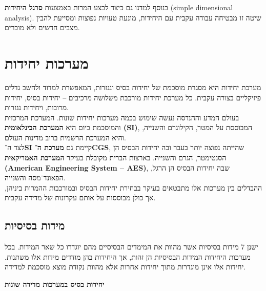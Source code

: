 \documentclass[
  hebrew,
  letterpaper,
  DIV=11,
  numbers=noendperiod]{scrreprt}
\begin{document}
{בנוסף למדנו גם כיצד לבצע המרות באמצעות \textbf{סרגל היחידות} (}simple
dimensional analysis{). שיטה זו מבטיחה עבודה עקבית עם היחידות, מונעת
טעויות נפוצות ומסייעת להבין מצבים חדשים ולא מוכרים.}

\section{\texorpdfstring{{מערכות
יחידות}}{מערכות יחידות}}\label{ux5deux5e2ux5e8ux5dbux5d5ux5ea-ux5d9ux5d7ux5d9ux5d3ux5d5ux5ea}

מערכת יחידות היא מסגרת מוסכמת של יחידות בסיס ונגזרות, המאפשרת למדוד
ולחשב גדלים פיזיקליים בצורה עקבית. כל מערכת יחידות מורכבת משלושה מרכיבים
-- יחידות בסיס, יחידות מרובות, ויחידות נגזרות.\\
בעולם המדע וההנדסה נעשה שימוש בכמה מערכות יחידות שונות. המערכת המרכזית
והמוסכמת כיום היא \textbf{המערכת הבינלאומית (SI)}, המבוססת על המטר,
הקילוגרם והשנייה, והיא המערכת הרשמית ברוב מדינות העולם.\\
לצד ה־\textbf{SI} קיימת גם \textbf{מערכת ה־CGS}, שהייתה נפוצה יותר בעבר
ובה יחידות הבסיס הן הסנטימטר, הגרם והשנייה. בארצות הברית מקובלת בעיקר
\textbf{המערכת האמריקאית (American Engineering System -- AES)}, שבה
יחידות הבסיס הן הרגל, הפאונד־מסה והשנייה.\\
ההבדלים בין מערכות אלו מתבטאים בעיקר בבחירת יחידות הבסיס ובמורכבות
ההמרות ביניהן, אך כולן מבוססות על אותם עקרונות של מדידה עקבית.

\subsection{\texorpdfstring{{מידות
בסיסיות}}{מידות בסיסיות}}\label{ux5deux5d9ux5d3ux5d5ux5ea-ux5d1ux5e1ux5d9ux5e1ux5d9ux5d5ux5ea}

ישנן 7 מידות בסיסיות אשר מהוות את המימדים הבסיסיים מהם יוגדרו כל שאר
המידות. בכל מערכות היחידות המידות הבסיסיות הן זהות, אך היחידות בהן
מודדים מידות אלו משתנות. יחידות אלו אינן מוגדרות מתוך יחידות אחרות אלא
מהוות נקודת מוצא מוסכמת למדידה.

\textbf{יחידות בסיס במערכות מדידה שונות}
\end{document}
